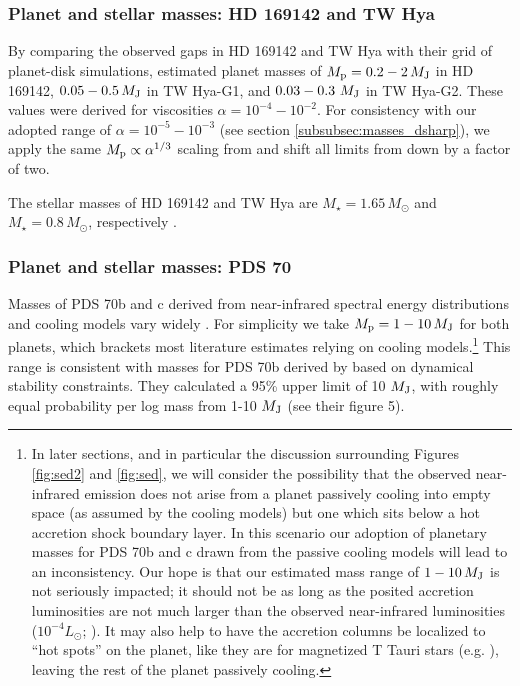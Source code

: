 \documentclass[fleqn,usenatbib]{mnras}
\newcommand{\Msun}{M_{\odot}}
\newcommand{\Mj}{M_{\rm J}}
\begin{document}
\subsubsection{Planet and stellar masses: HD 169142 and TW Hya}
By comparing the observed gaps in HD 169142 and TW Hya with their grid of planet-disk simulations, \cite{dong_fung_2017} estimated planet masses of $M_{\rm p} = 0.2-2\,\Mj$ in HD 169142, $0.05-0.5\,\Mj$ in TW Hya-G1, and $0.03-0.3\,\,\Mj$ in TW Hya-G2. These values were derived for viscosities $\alpha = 10^{-4}-10^{-2}$. For consistency with our adopted range of $\alpha = 10^{-5}-10^{-3}$ (see section \ref{subsubsec:masses_dsharp}), we apply the same $M_{\rm p} \propto \alpha^{1/3}$ scaling from \cite{zhang_etal_2018} and shift all limits from \cite{dong_fung_2017} down by a factor of two.

The stellar masses of HD 169142 and TW Hya are $M_{\star} = 1.65 \, \Msun$ and $M_{\star} = 0.8\,\Msun$, respectively \citep{blondel_dije_2006, ducourant_etal_2015}.

\subsubsection{Planet and stellar masses: PDS 70} 
Masses of PDS 70b and c derived from near-infrared spectral energy distributions and cooling models
vary widely \citep{muller_etal_2018, keppler_etal_2018, christiaens_etal_2019, mesa_etal_2019, wang_etal_2020, stolker_etal_2020}. For simplicity we take $M_{\rm p}= 1-10 \,\Mj$ for both planets, which brackets most literature estimates 
relying on cooling models.\footnote{In later sections, and in particular the discussion surrounding Figures \ref{fig:sed2} and \ref{fig:sed}, we will consider the possibility that the observed near-infrared emission does not 
arise from a planet passively cooling into empty space (as assumed by the cooling models) 
but one which sits below a hot accretion shock boundary layer. In this scenario our adoption of planetary masses for PDS 70b and c drawn from the passive cooling models will lead to an inconsistency.  
Our hope is that our estimated mass range of $1-10 \,M_{\rm J}$ is not seriously impacted; it should not be as long as the posited accretion luminosities are not much larger than the observed near-infrared luminosities ($10^{-4} L_\odot$;
\citealt{wang_etal_2020}). It may also help to have the accretion columns be localized to ``hot spots'' on the planet, like they are for magnetized T Tauri stars (e.g. \citealt{gregory_etal_2006}), leaving the rest of the planet passively cooling.
} This range is consistent with masses for PDS 70b derived by \cite{wang_etal_2021} based on dynamical stability constraints. They calculated a 95\% upper limit of 10 $M_{\rm J}$, with roughly equal probability per log mass from 1-10 $M_{\rm J}$ (see their figure 5). 
\end{document}
